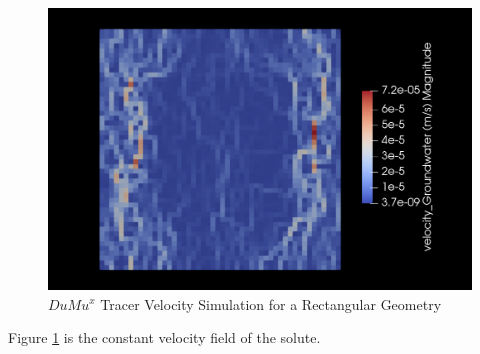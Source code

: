\begin{figure}[h]
\centering
\includegraphics[width=162mm]{tracer_velocity}
\caption{\footnotesize $DuMu^x$ Tracer Velocity Simulation for a Rectangular Geometry}
\label{fig:tracer_velocity}
\end{figure}
Figure \ref{fig:tracer_velocity} is the constant velocity field of the solute.\\